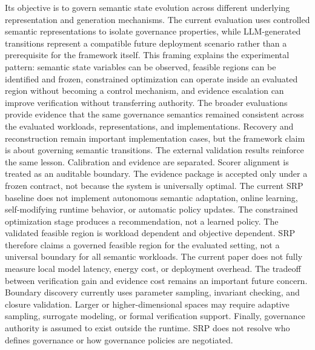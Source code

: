 {}Its objective is to govern semantic state evolution across different underlying representation and generation mechanisms. The current evaluation uses controlled semantic representations to isolate governance properties, while LLM-generated transitions represent a compatible future deployment scenario rather than a prerequisite for the framework itself.\markdownRendererParagraphSeparator
{}This framing explains the experimental pattern: semantic state variables can be observed, feasible regions can be identified and frozen, constrained optimization can operate inside an evaluated region without becoming a control mechanism, and evidence escalation can improve verification without transferring authority. The broader evaluations provide evidence that the same governance semantics remained consistent across the evaluated workloads, representations, and implementations. Recovery and reconstruction remain important implementation cases, but the framework claim is about governing semantic transitions.\markdownRendererParagraphSeparator
{}The external validation results reinforce the same lesson. Calibration and evidence are separated. Scorer alignment is treated as an auditable boundary. The evidence package is accepted only under a frozen contract, not because the system is universally optimal.\markdownRendererInterblockSeparator
{}
\markdownRendererSectionEnd 
\markdownRendererSectionEnd \markdownRendererSectionBegin
{}\markdownRendererInterblockSeparator
{}The current SRP baseline does not implement autonomous semantic adaptation, online learning, self-modifying runtime behavior, or automatic policy updates. The constrained optimization stage produces a recommendation, not a learned policy.\markdownRendererParagraphSeparator
{}The validated feasible region is workload dependent and objective dependent. SRP therefore claims a governed feasible region for the evaluated setting, not a universal boundary for all semantic workloads.\markdownRendererParagraphSeparator
{}The current paper does not fully measure local model latency, energy cost, or deployment overhead. The tradeoff between verification gain and evidence cost remains an important future concern.\markdownRendererParagraphSeparator
{}Boundary discovery currently uses parameter sampling, invariant checking, and closure validation. Larger or higher-dimensional spaces may require adaptive sampling, surrogate modeling, or formal verification support.\markdownRendererParagraphSeparator
{}Finally, governance authority is assumed to exist outside the runtime. SRP does not resolve who defines governance or how governance policies are negotiated.\markdownRendererParagraphSeparator

